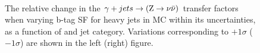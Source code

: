 \begin{figure}[!h]
  \centering
   ~~
  \\

  \caption{\label{fig:tfSyst_bsf_gjToZinv} The relative change in the
  $\gj \rightarrow (\znunu)$ transfer
  factors when varying b-tag SF for heavy jets in MC within its uncertainties, as a function of \scalht and jet category. 
  Variations corresponding to $+1\sigma$ ($-1\sigma$) are shown in the left (right) figure. 
  }
\end{figure}

